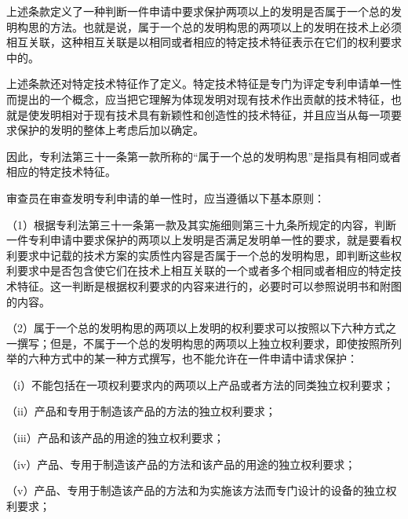 上述条款定义了一种判断一件申请中要求保护两项以上的发明是否属于一个总的发明构思的方法。也就是说，属于一个总的发明构思的两项以上的发明在技术上必须相互关联，这种相互关联是以相同或者相应的特定技术特征表示在它们的权利要求中的。

上述条款还对特定技术特征作了定义。特定技术特征是专门为评定专利申请单一性而提出的一个概念，应当把它理解为体现发明对现有技术作出贡献的技术特征，也就是使发明相对于现有技术具有新颖性和创造性的技术特征，并且应当从每一项要求保护的发明的整体上考虑后加以确定。

因此，专利法第三十一条第一款所称的“属于一个总的发明构思”是指具有相同或者相应的特定技术特征。

审查员在审查发明专利申请的单一性时，应当遵循以下基本原则：

{\setlength{\parindent}{17.1bp}（1）根据专利法第三十一条第一款及其实施细则第三十九条所规定的内容，判断一件专利申请中要求保护的两项以上发明是否满足发明单一性的要求，就是要看权利要求中记载的技术方案的实质性内容是否属于一个总的发明构思，即判断这些权利要求中是否包含使它们在技术上相互关联的一个或者多个相同或者相应的特定技术特征。这一判断是根据权利要求的内容来进行的，必要时可以参照说明书和附图的内容。\par}

{\setlength{\parindent}{17.1bp}（2）属于一个总的发明构思的两项以上发明的权利要求可以按照以下六种方式之一撰写；但是，不属于一个总的发明构思的两项以上独立权利要求，即使按照所列举的六种方式中的某一种方式撰写，也不能允许在一件申请中请求保护：\par}

{\setlength{\parindent}{17.1bp}（i）不能包括在一项权利要求内的两项以上产品或者方法的同类独立权利要求；\par}

{\setlength{\parindent}{17.1bp}（ii）产品和专用于制造该产品的方法的独立权利要求；\par}

{\setlength{\parindent}{17.1bp}（iii）产品和该产品的用途的独立权利要求；\par}

{\setlength{\parindent}{17.1bp}（iv）产品、专用于制造该产品的方法和该产品的用途的独立权利要求；\par}

{\setlength{\parindent}{17.1bp}（v）产品、专用于制造该产品的方法和为实施该方法而专门设计的设备的独立权利要求；\par}

